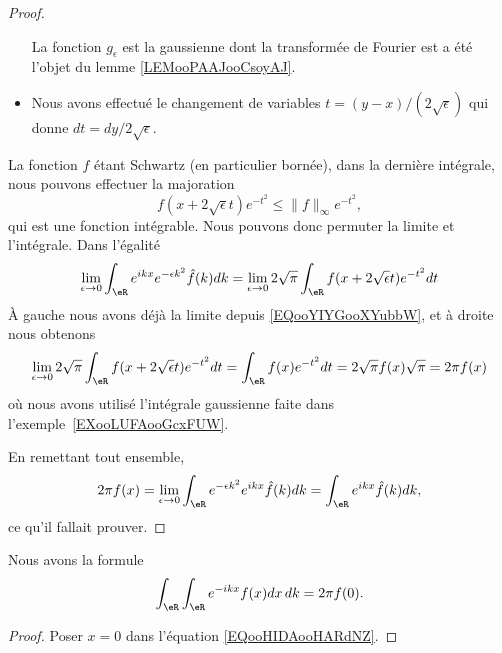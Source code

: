 \begin{proof}
\begin{itemize}
           La fonction \( g_{\epsilon}\) est la gaussienne dont la transformée de Fourier est a été l'objet du lemme \ref{LEMooPAAJooCsoyAJ}.
       \item
           Nous avons effectué le changement de variables \( t=(y-x)/(2\sqrt{ \epsilon })\) qui donne \( dt=dy/2\sqrt{ \epsilon }\).
    \end{itemize}
    La fonction \( f\) étant Schwartz (en particulier bornée), dans la dernière intégrale, nous pouvons effectuer la majoration
    \begin{equation}
        f(x+2\sqrt{ \epsilon }t) e^{-t^2}\leq \| f \|_{\infty} e^{-t^2},
    \end{equation}
    qui est une fonction intégrable. Nous pouvons donc permuter la limite et l'intégrale. Dans l'égalité
    \begin{equation}
        \lim_{\epsilon\to 0}\int_{\eR} e^{ikx} e^{-\epsilon k^2}\hat f(k)dk =\lim_{\epsilon\to 0} 2\sqrt{ \pi }\int_{\eR}f(x+2\sqrt{ \epsilon }t) e^{-t^2}dt
    \end{equation}
    À gauche nous avons déjà la limite depuis \eqref{EQooYIYGooXYubbW}, et à droite nous obtenons
    \begin{equation}
        \lim_{\epsilon\to 0} 2\sqrt{ \pi }\int_{\eR}f(x+2\sqrt{ \epsilon }t) e^{-t^2}dt=\int_{\eR}f(x) e^{-t^2}dt=2\sqrt{ \pi }f(x)\sqrt{ \pi }=2\pi f(x)
    \end{equation}
    où nous avons utilisé l'intégrale gaussienne faite dans l'exemple~\ref{EXooLUFAooGcxFUW}.

    En remettant tout ensemble,
    \begin{equation}
        2\pi f(x)=\lim_{\epsilon\to 0}\int_{\eR} e^{-\epsilon k^2} e^{ikx}\hat f(k)dk=\int_{\eR} e^{ikx}\hat f(k)dk,
    \end{equation}
    ce qu'il fallait prouver.
\end{proof}

\begin{corollary}       \label{CORooAZLZooSviTej}
    Nous avons la formule
    \begin{equation}        \label{EQooRJXRooElEMAa}
        \int_{\eR}\int_{\eR} e^{-ikx}f(x)dx\,dk=2\pi f(0).
    \end{equation}
\end{corollary}

\begin{proof}
    Poser \( x=0\) dans l'équation \eqref{EQooHIDAooHARdNZ}.
\end{proof}

